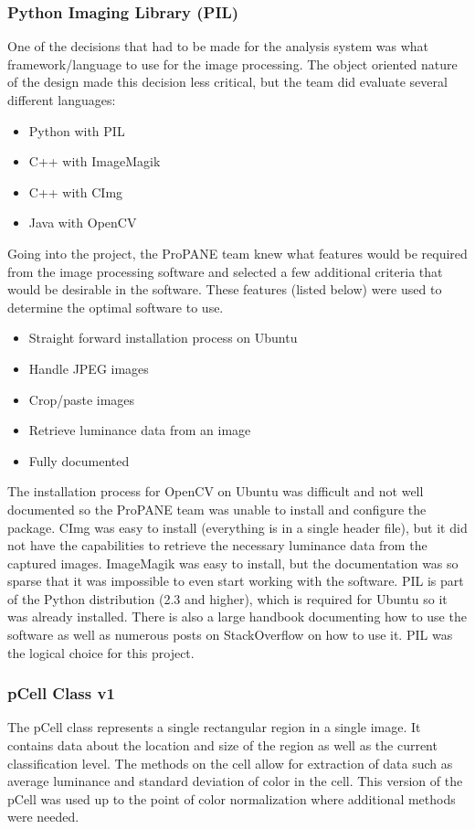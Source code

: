 \documentclass[]{article}
\begin{document}
			\subsubsection{Python Imaging Library (PIL)}
				One of the decisions that had to be made for the analysis system was what framework/language to use for the image processing. The object oriented nature of the design made this decision less critical, but the team did evaluate several different languages:
				\begin{itemize}
					\item Python with PIL
					\item C++ with ImageMagik
					\item C++ with CImg
					\item Java with OpenCV
				\end{itemize}
				Going into the project, the ProPANE team knew what features would be required from the image processing software and selected a few additional criteria that would be desirable in the software. These features (listed below) were used to determine the optimal software to use.
				\begin{itemize}
					\item Straight forward installation process on Ubuntu
					\item Handle JPEG images
					\item Crop/paste images
					\item Retrieve luminance data from an image
					\item Fully documented
				\end{itemize}
				The installation process for OpenCV on Ubuntu was difficult and not well documented so the ProPANE team was unable to install and configure the package. CImg was easy to install (everything is in a single header file), but it did not have the capabilities to retrieve the necessary luminance data from the captured images. ImageMagik was easy to install, but the documentation was so sparse that it was impossible to even start working with the software. PIL is part of the Python distribution (2.3 and higher), which is required for Ubuntu so it was already installed. There is also a large handbook documenting how to use the software as well as numerous posts on StackOverflow on how to use it. PIL was the logical choice for this project. 
			
			\subsubsection{pCell Class v1}
				The pCell class represents a single rectangular region in a single image. It contains data about the location and size of the region as well as the current classification level. The methods on the cell allow for extraction of data such as average luminance and standard deviation of color in the cell. This version of the pCell was used up to the point of color normalization where additional methods were needed.
				
\end{document}
